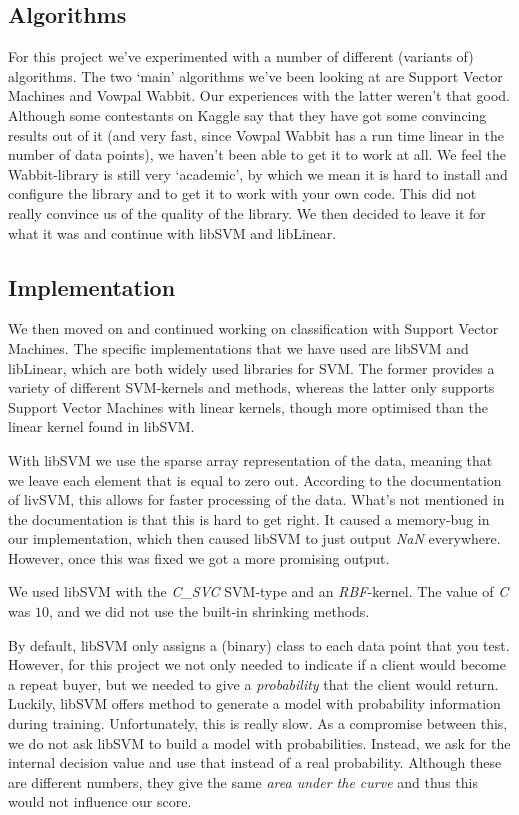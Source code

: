 \documentclass[a4paper]{article}
\begin{document}
\subsection{Algorithms}
For this project we've experimented with a number of different (variants of) algorithms. The two `main' algorithms we've been looking at are Support Vector Machines and Vowpal Wabbit. Our experiences with the latter weren't that good. Although some contestants on Kaggle say that they have got some convincing results out of it (and very fast, since Vowpal Wabbit has a run time linear in the number of data points), we haven't been able to get it to work at all. We feel the Wabbit-library is still very `academic', by which we mean it is hard to install and configure the library and to get it to work with your own code. This did not really convince us of the quality of the library. We then decided to leave it for what it was and continue with libSVM and libLinear.
\subsection{Implementation}
We then moved on and continued working on classification with Support Vector Machines. The specific implementations that we have used are libSVM and libLinear, which are both widely used libraries for SVM. The former provides a variety of different SVM-kernels and methods, whereas the latter only supports Support Vector Machines with linear kernels, though more optimised than the linear kernel found in libSVM.

With libSVM we use the sparse array representation of the data, meaning that we leave each element that is equal to zero out. According to the documentation of livSVM, this allows for faster processing of the data. What's not mentioned in the documentation is that this is hard to get right. It caused a memory-bug in our implementation, which then caused libSVM to just output \emph{NaN} everywhere. However, once this was fixed we got a more promising output.

We used libSVM with the \emph{C\_SVC} SVM-type and an \emph{RBF}-kernel. The value of \emph{C} was $10$, and we did not use the built-in shrinking methods.

By default, libSVM only assigns a (binary) class to each data point that you test. However, for this project we not only needed to indicate if a client would become a repeat buyer, but we needed to give a \emph{probability} that the client would return. Luckily, libSVM offers method to generate a model with probability information during training. Unfortunately, this is really slow. As a compromise between this, we do not ask libSVM to build a model with probabilities. Instead, we ask for the internal decision value and use that instead of a real probability. Although these are different numbers, they give the same \emph{area under the curve} and thus this would not influence our score.
\end{document}
